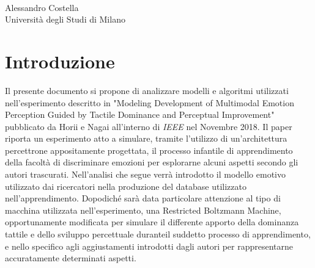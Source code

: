 \documentclass[10pt,letterpaper]{article}
\begin{document}
\vspace*{0.2in}

\begin{flushleft}
\begin{center}
\centering
{\Large
\textbf{
}}
\newline
\\
Alessandro Costella
\\
\bigskip
 Università degli Studi di Milano
\\
\bigskip

\end{center}
\end{flushleft}


\section{Introduzione}
Il presente documento si propone di analizzare modelli e algoritmi utilizzati nell'esperimento descritto in "Modeling Development of Multimodal Emotion Perception Guided by Tactile Dominance and Perceptual Improvement" pubblicato da Horii e Nagai all'interno di \textit{IEEE} nel Novembre 2018. Il paper riporta un esperimento atto a simulare, tramite l'utilizzo di un'architettura percettrone appositamente progettata, il processo infantile di apprendimento della facoltà di discriminare emozioni per esplorarne alcuni aspetti secondo gli autori trascurati. Nell'analisi che segue verrà introdotto il modello emotivo utilizzato dai ricercatori nella produzione del database utilizzato nell'apprendimento. Dopodiché sarà data particolare attenzione al tipo di macchina utilizzata nell'esperimento, una Restricted Boltzmann Machine, opportunamente modificata per simulare il differente apporto della dominanza tattile e dello sviluppo percettuale duranteil suddetto processo di apprendimento, e nello specifico agli aggiustamenti introdotti dagli autori per rappresentarne accuratamente determinati aspetti.
\end{document}
